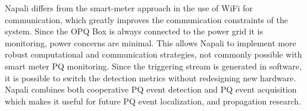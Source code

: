 Napali differs from the smart-meter approach in the use of WiFi for communication, which greatly improves the communication constraints of the system. Since the OPQ Box is always connected to the power grid it is monitoring, power concerns are minimal. This allows Napali to implement more robust computational and communication strategies, not commonly possible with smart meter PQ monitoring. Since the triggering stream is generated in software, it is possible to switch the detection metrics without redesigning new hardware. Napali combines both cooperative PQ event detection and PQ event acquisition which makes it useful for future PQ event localization, and propagation research. \cite{parsons1998direction} \cite{polajvzer2017evaluation}
